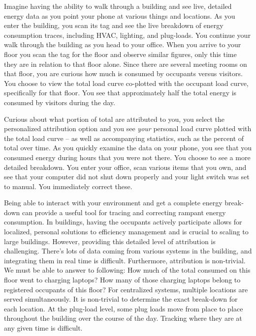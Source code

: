 Imagine having the ability to walk through a building and see live, detailed energy data as
you point your phone at various things and locations.  As you enter the building, you scan its tag and see
the live breakdown of energy consumption traces, including HVAC, lighting, and plug-loads.  You continue
your walk through the building as you head to your office.  When you arrive to your floor
you scan the tag for the floor and observe similar figures, only this time they are in relation to that floor
alone.  Since there are several meeting rooms on that floor, you are curious how much is consumed by 
occupants versus visitors.  You choose to view the total load curve co-plotted with the occupant
load curve, specifically for that floor.  You see that approximately half the total energy is consumed
by visitors during the day.  

Curious about what portion of total are attributed to you, you select the 
personalized attribution option and you see \emph{your} personal load curve plotted
with the total load curve -- as well as accompanying statistics, such as the percent of total over time.
As you quickly examine the data on your phone, you see that you consumed energy during hours that you were not
there.  You choose to see a more detailed breakdown.  You enter your office, scan various items that you own, and see that
your computer did not shut down properly and your light switch was set to manual.  You immediately 
correct these.

Being able to interact with your environment and get a complete energy break-down can provide a useful tool
for tracing and correcting rampant energy consumption.  In buildings, having the occupants actively participate
allows for localized, personal solutions to efficiency management and is crucial to scaling to large buildings.
However, providing this detailed level of attribution is challenging.  There's lots of data coming from various systems 
in the building, and integrating them in real time is difficult.  Furthermore, attribution is non-trivial.  
We must be able to answer to following: How much of the total consumed on this floor went to charging laptops?  How
many of those charging laptops belong to registered occupants of this floor?
For centralized systems, multiple locations are served simultaneously.  It is non-trivial to determine the exact
break-down for each location.  At the plug-load level, some plug loads move from place to place throughout the building
over the course of the day.  Tracking where they are at any given time is difficult.

